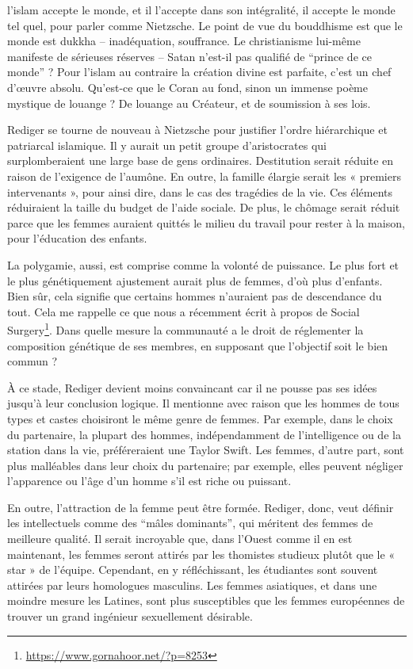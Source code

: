 \begin{quotex}
l'islam accepte le monde, et il l'accepte dans son intégralité, il accepte le monde tel quel, pour parler comme Nietzsche. Le point de vue du bouddhisme est que le monde est dukkha -- inadéquation, souffrance. Le christianisme lui-même manifeste de sérieuses réserves -- Satan n'est-il pas qualifié de ``prince de ce monde'' ? Pour l'islam au contraire la création divine est parfaite, c'est un chef d'œuvre absolu. Qu'est-ce que le Coran au fond, sinon un immense poème mystique de louange ? De louange au Créateur, et de soumission à ses lois.
\end{quotex}


Rediger se tourne de nouveau à Nietzsche pour justifier l'ordre hié\-rar\-chique et patriarcal islamique. Il y aurait un petit groupe d'aristocrates qui surplomberaient une large base de gens ordinaires. Destitution serait réduite en raison de l'exigence de l'aumône. En outre, la famille élargie serait les « premiers intervenants », pour ainsi dire, dans le cas des tragédies de la vie. Ces éléments réduiraient la taille du budget de l'aide sociale. De plus, le chômage serait réduit parce que les femmes auraient quittés le milieu du travail pour rester à la maison, pour l'éducation des enfants.

La polygamie, aussi, est comprise comme la volonté de puissance. Le plus fort et le plus génétiquement ajustement aurait plus de femmes, d'où plus d'enfants. Bien sûr, cela signifie que certains hommes n'auraient pas de descendance du tout. Cela me rappelle ce que nous a récemment écrit à propos de Social Surgery\footnote{\url{https://www.gornahoor.net/?p=8253}}. Dans quelle mesure la communauté a le droit de réglementer la composition génétique de ses membres, en supposant que l'objectif soit le bien commun ?

À ce stade, Rediger devient moins convaincant car il ne pousse pas ses idées jusqu'à leur conclusion logique. Il mentionne avec raison que les hommes de tous types et castes choisiront le même genre de femmes. Par exemple, dans le choix du partenaire, la plupart des hommes, in\-dépen\-dam\-ment de l'intelligence ou de la station dans la vie, préféreraient une Taylor Swift. Les femmes, d'autre part, sont plus malléables dans leur choix du partenaire; par exemple, elles peuvent négliger l'apparence ou l'âge d'un homme s'il est riche ou puissant.

En outre, l'attraction de la femme peut être formée. Rediger, donc, veut définir les intellectuels comme des ``mâles dominants'', qui méritent des femmes de meilleure qualité. Il serait incroyable que, dans l'Ouest comme il en est maintenant, les femmes seront attirés par les thomistes studieux plutôt que le «  star  » de l'équipe. Cependant, en y réfléchissant, les étudiantes sont souvent attirées par leurs homologues masculins. Les femmes asiatiques, et dans une moindre mesure les Latines, sont plus susceptibles que les femmes européennes de trouver un grand ingénieur sexuellement désirable.

